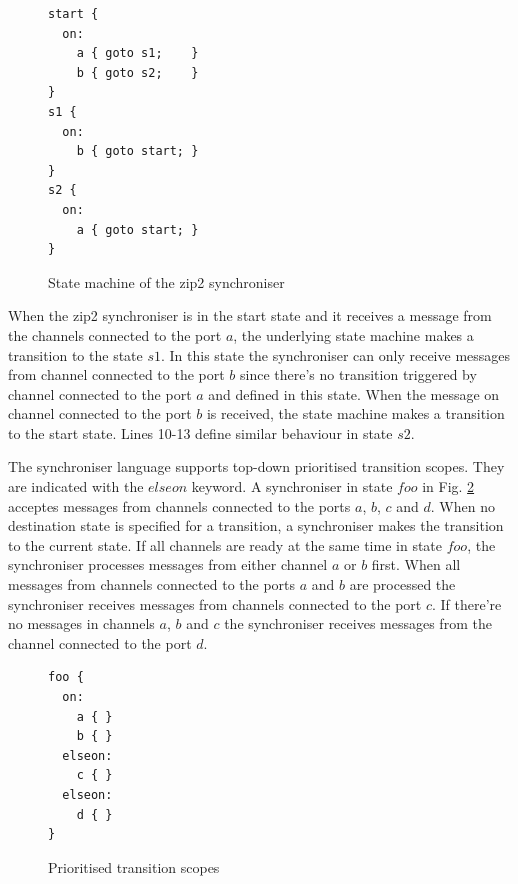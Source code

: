 \begin{figure}[h!]
\lstset{numbers=left, numberstyle=\small, stepnumber=1, numbersep=8pt}
\begin{lstlisting}[frame=single]
start {
  on:
    a { goto s1;    }
    b { goto s2;    }
}
s1 {
  on:
    b { goto start; }
}
s2 {
  on:
    a { goto start; }
}
\end{lstlisting}
\caption{State machine of the zip2 synchroniser}
\label{zip_struc}
\end{figure}

When the zip2 synchroniser is in the start state and it receives a message from the channels connected to the port $a$, the underlying state machine makes a transition to the state $s1$. In this state the synchroniser can only receive messages from channel connected to the port $b$ since there's no transition triggered by channel connected to the port $a$ and defined in this state. When the message on channel connected to the port $b$ is received, the state machine makes a transition to the start state. Lines 10-13 define similar behaviour in state $s2$.

The synchroniser language supports top-down prioritised transition scopes. They are indicated with the $elseon$ keyword. A synchroniser in state $foo$ in Fig. \ref{sync_scope} acceptes messages from channels connected to the ports $a$, $b$, $c$ and $d$. When no destination state is specified for a transition, a synchroniser makes the transition to the current state. If all channels are ready at the same time in state $foo$, the synchroniser processes messages from either channel $a$ or $b$ first. When all messages from channels connected to the ports $a$ and $b$ are processed the synchroniser receives messages from channels connected to the port $c$. If there're no messages in channels $a$, $b$ and $c$ the synchroniser receives messages from the channel connected to the port $d$.

\begin{figure}[h!]
\lstset{numbers=left, numberstyle=\small, stepnumber=1, numbersep=8pt}
\begin{lstlisting}[frame=single]
foo {
  on:
    a { }
    b { }
  elseon:
    c { }
  elseon:
    d { }
}
\end{lstlisting}
\caption{Prioritised transition scopes}
\label{sync_scope}
\end{figure}



